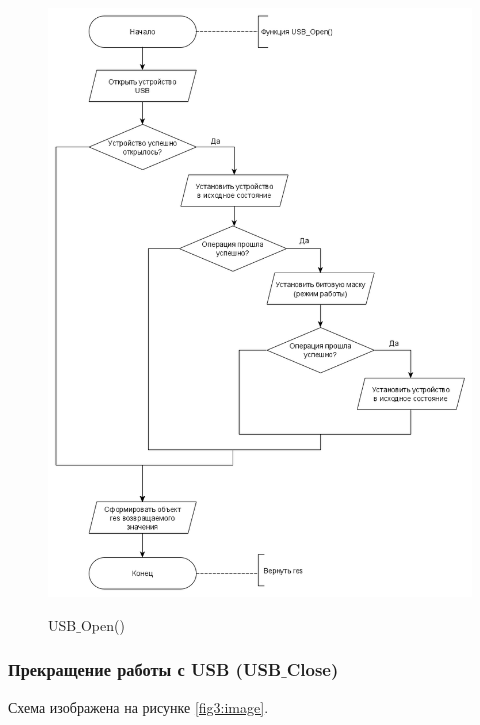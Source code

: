 	\begin{figure}[ph!]
		\centering
		\begin{center}
			{\includegraphics[scale=0.5]{schemes/usb_open.png}}
			\caption{USB$\_$Open()}
			\label{fig2:image}
		\end{center}
	\end{figure}

	\subsubsection{Прекращение работы с USB (USB$\_$Close)}
	
	Схема изображена на рисунке \ref{fig3:image}.
	
